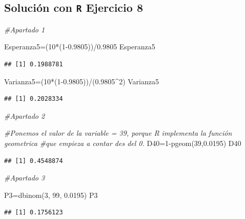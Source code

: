 \documentclass[
]{article}
\newenvironment{Shaded}{\begin{snugshade}}{\end{snugshade}}
\newcommand{\CommentTok}[1]{\textcolor[rgb]{0.56,0.35,0.01}{\textit{#1}}}
\newcommand{\DecValTok}[1]{\textcolor[rgb]{0.00,0.00,0.81}{#1}}
\newcommand{\FloatTok}[1]{\textcolor[rgb]{0.00,0.00,0.81}{#1}}
\newcommand{\FunctionTok}[1]{\textcolor[rgb]{0.00,0.00,0.00}{#1}}
\newcommand{\NormalTok}[1]{#1}
\newcommand{\OtherTok}[1]{\textcolor[rgb]{0.56,0.35,0.01}{#1}}
\newcommand{\SpecialCharTok}[1]{\textcolor[rgb]{0.00,0.00,0.00}{#1}}
\begin{document}
\hypertarget{soluciuxf3n-con-r-ejercicio-8}{%
\subsection{\texorpdfstring{Solución con \texttt{R} Ejercicio
8}{Solución con R Ejercicio 8}}\label{soluciuxf3n-con-r-ejercicio-8}}

\begin{Shaded}
\begin{Highlighting}[]
\CommentTok{\#Apartado 1}

\NormalTok{Esperanza5}\OtherTok{=}\NormalTok{(}\DecValTok{10}\SpecialCharTok{*}\NormalTok{(}\DecValTok{1}\FloatTok{{-}0.9805}\NormalTok{))}\SpecialCharTok{/}\FloatTok{0.9805}
\NormalTok{Esperanza5}
\end{Highlighting}
\end{Shaded}

\begin{verbatim}
## [1] 0.1988781
\end{verbatim}

\begin{Shaded}
\begin{Highlighting}[]
\NormalTok{Varianza5}\OtherTok{=}\NormalTok{(}\DecValTok{10}\SpecialCharTok{*}\NormalTok{(}\DecValTok{1}\FloatTok{{-}0.9805}\NormalTok{))}\SpecialCharTok{/}\NormalTok{(}\FloatTok{0.9805}\SpecialCharTok{\^{}}\DecValTok{2}\NormalTok{)}
\NormalTok{Varianza5}
\end{Highlighting}
\end{Shaded}

\begin{verbatim}
## [1] 0.2028334
\end{verbatim}

\begin{Shaded}
\begin{Highlighting}[]
\CommentTok{\#Apartado 2}

\CommentTok{\#Ponemos el valor de la variable = 39, porque R implementa la función geometrica}
\CommentTok{\#que empieza a contar des del 0.}
\NormalTok{D40}\OtherTok{=}\DecValTok{1}\SpecialCharTok{{-}}\FunctionTok{pgeom}\NormalTok{(}\DecValTok{39}\NormalTok{,}\FloatTok{0.0195}\NormalTok{)}
\NormalTok{D40}
\end{Highlighting}
\end{Shaded}

\begin{verbatim}
## [1] 0.4548874
\end{verbatim}

\begin{Shaded}
\begin{Highlighting}[]
\CommentTok{\#Apartado 3}

\NormalTok{P3}\OtherTok{=}\FunctionTok{dbinom}\NormalTok{(}\DecValTok{3}\NormalTok{, }\DecValTok{99}\NormalTok{, }\FloatTok{0.0195}\NormalTok{)}
\NormalTok{P3}
\end{Highlighting}
\end{Shaded}

\begin{verbatim}
## [1] 0.1756123
\end{verbatim}
\end{document}
